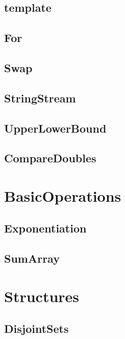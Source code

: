\subsection{ template}
\raggedbottom
\hrulefill
\subsection{ For}
\raggedbottom
\hrulefill
\subsection{ Swap}
\raggedbottom
\hrulefill
\subsection{ StringStream}
\raggedbottom
\hrulefill
\subsection{ UpperLowerBound}
\raggedbottom
\hrulefill
\subsection{ CompareDoubles}
\raggedbottom
\hrulefill

\section{BasicOperations}
\subsection{ Exponentiation}
\raggedbottom
\hrulefill
\subsection{ SumArray}
\raggedbottom
\hrulefill

\section{Structures}
\subsection{ DisjointSets}
\raggedbottom
\hrulefill
